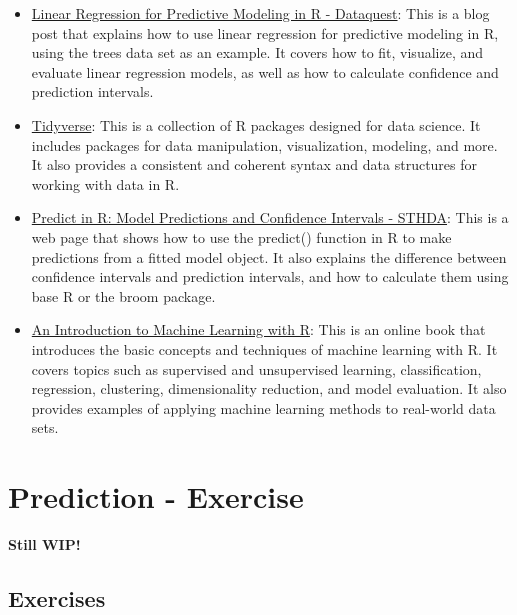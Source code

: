 \documentclass[
]{book}
\providecommand{\tightlist}{%
  \setlength{\itemsep}{0pt}\setlength{\parskip}{0pt}}
\begin{document}
\begin{itemize}
\tightlist
\item
  \href{https://www.dataquest.io/blog/statistical-learning-for-predictive-modeling-r/}{Linear Regression for Predictive Modeling in R - Dataquest}: This is a blog post that explains how to use linear regression for predictive modeling in R, using the trees data set as an example. It covers how to fit, visualize, and evaluate linear regression models, as well as how to calculate confidence and prediction intervals.
\item
  \href{https://www.tidyverse.org/}{Tidyverse}: This is a collection of R packages designed for data science. It includes packages for data manipulation, visualization, modeling, and more. It also provides a consistent and coherent syntax and data structures for working with data in R.
\item
  \href{http://www.sthda.com/english/articles/40-regression-analysis/166-predict-in-r-model-predictions-and-confidence-intervals/}{Predict in R: Model Predictions and Confidence Intervals - STHDA}: This is a web page that shows how to use the predict() function in R to make predictions from a fitted model object. It also explains the difference between confidence intervals and prediction intervals, and how to calculate them using base R or the broom package.
\item
  \href{https://lgatto.github.io/IntroMachineLearningWithR/}{An Introduction to Machine Learning with R}: This is an online book that introduces the basic concepts and techniques of machine learning with R. It covers topics such as supervised and unsupervised learning, classification, regression, clustering, dimensionality reduction, and model evaluation. It also provides examples of applying machine learning methods to real-world data sets.
\end{itemize}

\hypertarget{pm-a}{%
\chapter{Prediction - Exercise}\label{pm-a}}

\textbf{Still WIP!}

\hypertarget{exercises-1}{%
\section{Exercises}\label{exercises-1}}
\end{document}
